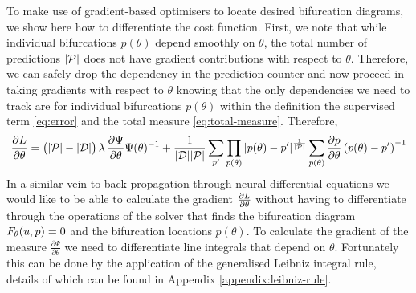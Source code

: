 \documentclass{article}
\begin{document}
To make use of gradient-based optimisers to locate desired bifurcation diagrams, we show here how to differentiate the cost function. First, we note that while individual bifurcations $p(\theta)$ depend smoothly on $\theta$, the total number of predictions $|\mathcal{P}|$ does not have gradient contributions with respect to $\theta$. Therefore, we can safely drop the dependency in the prediction counter and now proceed in taking gradients with respect to $\theta$ knowing that the only dependencies we need to track are for individual bifurcations $p(\theta)$ within the definition the supervised term \eqref{eq:error} and the total measure \eqref{eq:total-measure}. Therefore, 
\begin{align}
    \frac{\partial L}{\partial\theta}=
    \big(|\mathcal{P}|-|\mathcal{D}|\big)\,\lambda\,
    \frac{\partial \Psi}{\partial\theta}\Psi(\theta)^{-1}+
    \frac{1}{|\mathcal{D}||\mathcal{P}|}\sum_{p'}
    \prod_{p(\theta)}|p(\theta)-p'|^{\frac{1}{|\mathcal{P}|}}
    \sum_{p(\theta)}\frac{\partial p}{\partial\theta}\left(p(\theta)-p'\right)^{-1}
    \label{eq:gradient-loss}
\end{align}
In a similar vein to back-propagation through neural differential equations \cite{Chen2018NeuralEquations} we would like to be able to calculate the gradient $\frac{\partial L}{\partial\theta}$ without having to differentiate through the operations of the solver that finds the bifurcation diagram $F_{\theta}(u,p)=0$ and the bifurcation locations $p(\theta)$. To calculate the gradient of the measure $\frac{\partial \Psi}{\partial\theta}$ we need to differentiate line integrals that depend on $\theta$. Fortunately this can be done by the application of the generalised Leibniz integral rule, details of which can be found in Appendix \ref{appendix:leibniz-rule}.
\end{document}
